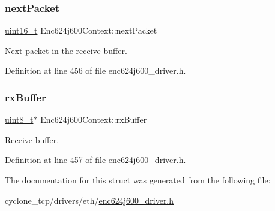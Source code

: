 \subsubsection{\texorpdfstring{next\+Packet}{nextPacket}}
{\footnotesize\ttfamily \hyperlink{stdint_8h_a273cf69d639a59973b6019625df33e30}{uint16\+\_\+t} Enc624j600\+Context\+::next\+Packet}



Next packet in the receive buffer. 



Definition at line 456 of file enc624j600\+\_\+driver.\+h.

\mbox{\label{structEnc624j600Context_a305c1bc66c5b374d8fa7ce52bdcb3b73}} 
\subsubsection{\texorpdfstring{rx\+Buffer}{rxBuffer}}
{\footnotesize\ttfamily \hyperlink{stdint_8h_aba7bc1797add20fe3efdf37ced1182c5}{uint8\+\_\+t}$\ast$ Enc624j600\+Context\+::rx\+Buffer}



Receive buffer. 



Definition at line 457 of file enc624j600\+\_\+driver.\+h.



The documentation for this struct was generated from the following file\+:\begin{DoxyCompactItemize}
\item 
cyclone\+\_\+tcp/drivers/eth/\hyperlink{enc624j600__driver_8h}{enc624j600\+\_\+driver.\+h}\end{DoxyCompactItemize}
